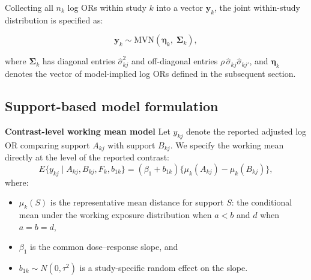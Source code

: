 \documentclass[journal=rsm]{CUP-JNL-DTM}%
\theoremstyle{definition}
\numberwithin{equation}{section}
\begin{document}
Collecting all $n_k$ log ORs within study $k$ into a vector $\mathbf{y}_k$, the joint within-study distribution is specified as:

%

\begin{equation}
\mathbf{y}_k \sim \mathrm{MVN}\!\left(
    \boldsymbol{\eta}_k,\; \boldsymbol{\Sigma}_k
  \right),
  \label{eq:within_study}
\end{equation}

%

where $\boldsymbol{\Sigma}_k$ has diagonal entries $\hat{\sigma}_{kj}^2$ and off-diagonal entries $\rho\,\hat{\sigma}_{kj}\hat{\sigma}_{kj'}$, and $\boldsymbol{\eta}_k$ denotes the vector of model-implied log ORs defined in the subsequent section.

\subsection{Support-based model formulation}
\noindent\textbf{Contrast-level working mean model}
\label{sec:model}
Let $y_{kj}$ denote the reported adjusted log OR
comparing support $A_{kj}$ with support $B_{kj}$. We specify the working mean
directly at the level of the reported contrast:
\begin{equation}
 E\{y_{kj}\mid A_{kj},B_{kj},F_k,b_{1k}\}
 = (\beta_1+b_{1k})
   \{\mu_k(A_{kj})-\mu_k(B_{kj})\},
 \label{eq:contrast_mean}
\end{equation}
where:
\begin{itemize}
  \item $\mu_k(S)$ is the representative mean distance for support $S$: the conditional mean under the working exposure distribution when $a<b$ and $d$ when $a=b=d$,
  \item $\beta_1$ is the common dose--response slope, and
  \item $b_{1k}\sim N(0,\tau^2)$ is a study-specific random effect on the
        slope.
\end{itemize}
\end{document}
